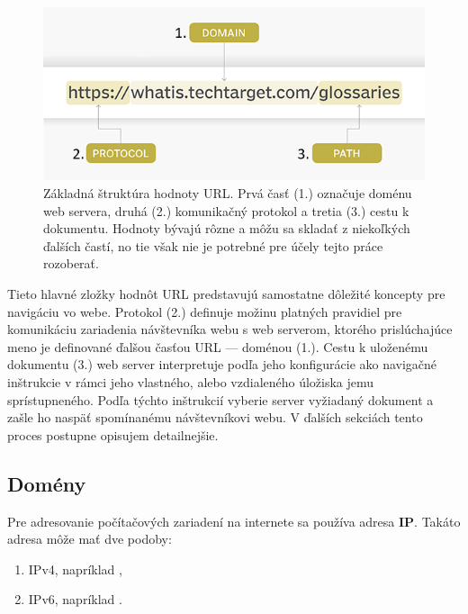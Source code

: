 \begin{figure}[htb]
\begin{center}
 \includegraphics[scale=0.52]{obrazky-figures/the-anatomy-of-a-url.png}
 \caption{\centering Základná štruktúra hodnoty URL. Prvá časť (1.) označuje doménu web servera, druhá (2.) komunikačný protokol a tretia (3.) cestu k dokumentu. Hodnoty bývajú rôzne a môžu sa skladať z niekoľkých ďalších častí, no tie však nie je potrebné pre účely tejto práce rozoberať.}
 \label{img:urlstructure}
\end{center}
\end{figure}

\pagebreak

Tieto hlavné zložky hodnôt URL predstavujú samostatne dôležité koncepty pre navigáciu vo webe.
Protokol (2.) definuje možinu platných pravidiel pre komunikáciu zariadenia návštevníka webu s web 
serverom, ktorého prislúchajúce meno je definované ďalšou časťou URL --- doménou (1.). 
Cestu k uloženému dokumentu (3.) web server interpretuje podľa jeho konfigurácie ako navigačné inštrukcie 
v rámci jeho vlastného, alebo vzdialeného úložiska jemu sprístupneného. 
Podľa týchto inštrukcií vyberie server vyžiadaný dokument a zašle ho naspäť spomínanému návštevníkovi webu.
V ďalších sekciách tento proces postupne opisujem detailnejšie.

\subsection{Domény}
\label{domeny}

Pre adresovanie počítačových zariadení na internete sa používa adresa \textbf{IP}.
Takáto adresa môže mať dve podoby:
\begin{enumerate}
    \item IPv4, napríklad ,
    \item IPv6, napríklad .
\end{enumerate}

